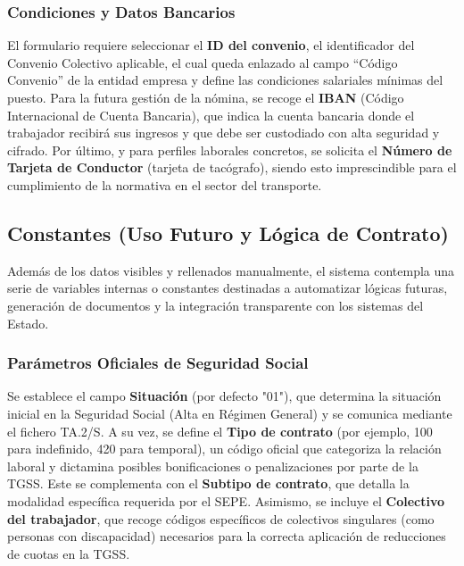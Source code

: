 \subsubsection{Condiciones y Datos Bancarios} El formulario requiere seleccionar el \textbf{ID del convenio}, el identificador del Convenio Colectivo aplicable, el cual queda enlazado al campo “Código Convenio” de la entidad empresa y define las condiciones salariales mínimas del puesto. Para la futura gestión de la nómina, se recoge el \textbf{IBAN} (Código Internacional de Cuenta Bancaria), que indica la cuenta bancaria donde el trabajador recibirá sus ingresos y que debe ser custodiado con alta seguridad y cifrado. Por último, y para perfiles laborales concretos, se solicita el \textbf{Número de Tarjeta de Conductor} (tarjeta de tacógrafo), siendo esto imprescindible para el cumplimiento de la normativa en el sector del transporte.

\subsection{Constantes (Uso Futuro y Lógica de Contrato)}

Además de los datos visibles y rellenados manualmente, el sistema contempla una serie de variables internas o constantes destinadas a automatizar lógicas futuras, generación de documentos y la integración transparente con los sistemas del Estado.

\subsubsection{Parámetros Oficiales de Seguridad Social} Se establece el campo \textbf{Situación} (por defecto "01"), que determina la situación inicial en la Seguridad Social (Alta en Régimen General) y se comunica mediante el fichero TA.2/S. A su vez, se define el \textbf{Tipo de contrato} (por ejemplo, 100 para indefinido, 420 para temporal), un código oficial que categoriza la relación laboral y dictamina posibles bonificaciones o penalizaciones por parte de la TGSS. Este se complementa con el \textbf{Subtipo de contrato}, que detalla la modalidad específica requerida por el SEPE. Asimismo, se incluye el \textbf{Colectivo del trabajador}, que recoge códigos específicos de colectivos singulares (como personas con discapacidad) necesarios para la correcta aplicación de reducciones de cuotas en la TGSS.

